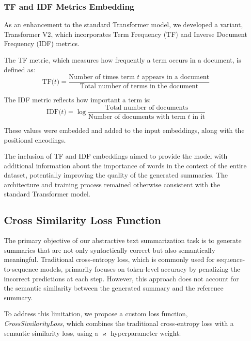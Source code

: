 \documentclass[a4papers, 11pt]{article}
\begin{document}
\subsubsection{TF and IDF Metrics Embedding}

As an enhancement to the standard Transformer model, we developed a variant, Transformer V2, which incorporates Term Frequency (TF) and Inverse Document Frequency (IDF) metrics.

The TF metric, which measures how frequently a term occurs in a document, is defined as:
\begin{equation}
    \text{TF($t$)} = \frac{\text{Number of times term $t$ appears in a document}}{\text{Total number of terms in the document}}
\end{equation}

The IDF metric reflects how important a term is: 
\begin{equation}
    \text{IDF($t$)} = \log \frac{\text{Total number of documents}}{\text{Number of documents with term $t$ in it}}
\end{equation}

These values were embedded and added to the input embeddings, along with the positional encodings.

The inclusion of TF and IDF embeddings aimed to provide the model with additional information about the importance of words in the context of the entire dataset, potentially improving the quality of the generated summaries. The architecture and training process remained otherwise consistent with the standard Transformer model.

\subsection{Cross Similarity Loss Function}
The primary objective of our abstractive text summarization task is to generate summaries that are not only syntactically correct but also semantically meaningful. Traditional cross-entropy loss, which is commonly used for sequence-to-sequence models, primarily focuses on token-level accuracy by penalizing the incorrect predictions at each step. However, this approach does not account for the semantic similarity between the generated summary and the reference summary.

To address this limitation, we propose a custom loss function, \textit{CrossSimilarityLoss}, which combines the traditional cross-entropy loss \citep{CrossEnrtopyLoss} with a semantic similarity loss, using a $\varkappa$ hyperparameter weight:
\end{document}

